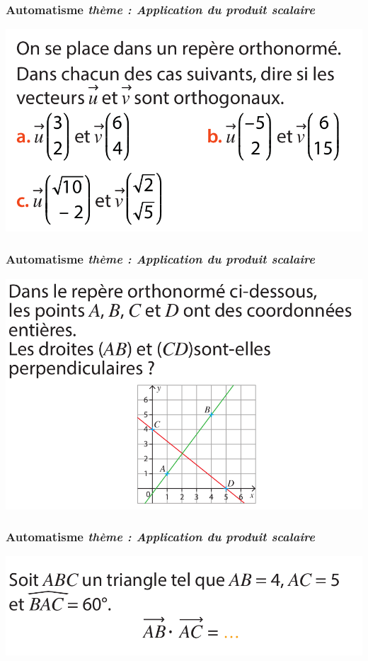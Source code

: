 \documentclass[11pt]{beamer}
\newcounter{autocompteur}
\newcommand{\automatisme}[1]{\addtocounter{autocompteur}{1}\frametitle{Automatisme  \theautocompteur  \textit{ thème : #1}}}
\begin{document}
\begin{frame}
\automatisme{Application du produit scalaire}

\begin{center}
\includegraphics[scale=0.3]{ressources/prodscal-1.png}
\end{center}


\end{frame}


\begin{frame}
\automatisme{Application du produit scalaire}

\begin{center}
\includegraphics[scale=0.3]{ressources/prodscal-2.png}
\end{center}


\end{frame}


\begin{frame}
\automatisme{Application du produit scalaire}

\begin{center}
\includegraphics[scale=0.3]{ressources/prodscal-3.png}
\end{center}


\end{frame}
\end{document}
